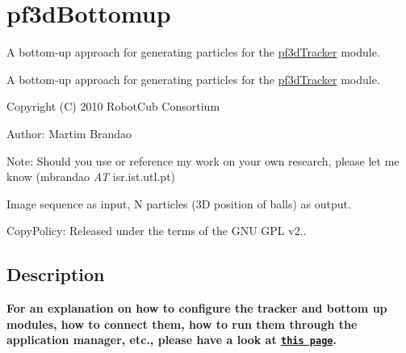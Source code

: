 \section{pf3d\+Bottomup}
\label{group__icub__pf3dBottomup}


A bottom-\/up approach for generating particles for the \hyperlink{group__icub__pf3dTracker}{pf3d\+Tracker} module.  


A bottom-\/up approach for generating particles for the \hyperlink{group__icub__pf3dTracker}{pf3d\+Tracker} module. 

Copyright (C) 2010 Robot\+Cub Consortium

Author\+: Martim Brandao

Note\+: Should you use or reference my work on your own research, please let me know (mbrandao {\itshape AT} isr.\+ist.\+utl.\+pt)

Image sequence as input, N particles (3D position of balls) as output.

Copy\+Policy\+: Released under the terms of the G\+NU G\+PL v2..\hypertarget{group__src__demoYoga_intro_sec}{}\subsection{Description}\label{group__src__demoYoga_intro_sec}
{\bfseries For an explanation on how to configure the tracker and bottom up modules, how to connect them, how to run them through the application manager, etc., please have a look at \href{http://mediawiki.isr.ist.utl.pt/wiki/3D_ball_tracker}{\tt this page}.} 